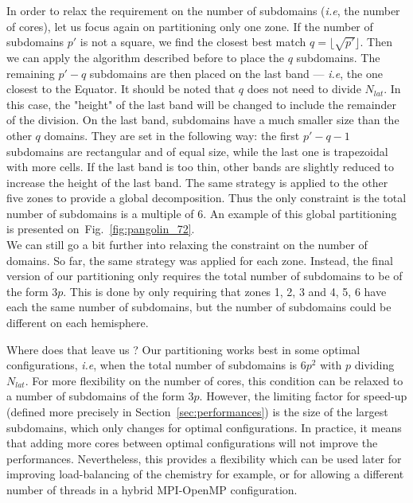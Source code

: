 In order to relax the requirement on the number of subdomains (\textit{i.e}, the
number of cores), let us focus again on partitioning only one zone. If the
number of subdomains $p'$ is not a square, we find the closest best match
$q=\lfloor \sqrt{p'}\rfloor$. Then we can apply the algorithm described before
to place the $q$ subdomains. The remaining $p'-q$ subdomains are then placed on the
last band --- \textit{i.e}, the one closest to the Equator. It should be noted
that $q$ does not need to divide $N_{lat}$. In this case, the "height" of
the last band will be changed to include the remainder of the division.  On the
last band, subdomains have a much smaller size than the other $q$
domains. They are set in the following way: the first $p'-q-1$ subdomains
are rectangular and of equal size, while the last one is trapezoidal with more
cells. If the last band is too thin, other bands are slightly reduced to
increase the height of the last band. The same strategy is applied to the other
five zones to provide a global decomposition. Thus the only constraint is the
total number of subdomains is a multiple of $6$. An example of this global
partitioning is presented on~Fig.~\ref{fig:pangolin_72}.\\
We can still go a bit further into relaxing the constraint on the number of
domains. So far, the same strategy was applied for each zone. Instead, the final
version of our partitioning only requires the total number of subdomains to be of
the form $3p$. This is done by only requiring that zones 1, 2, 3 and 4, 5, 6 have
each the same number of subdomains, but the number of subdomains could be different on
each hemisphere.

Where does that leave us ? Our partitioning works best in some optimal
configurations, \textit{i.e}, when the total number of subdomains is $6p^2$ with
$p$ dividing $N_{lat}$. For more flexibility on the number of cores, this
condition can be relaxed to a number of subdomains of the form $3p$. However, the
limiting factor for speed-up (defined more precisely in
Section~\ref{sec:performances}) is the size of the largest subdomains, which only
changes for optimal configurations. In practice, it means that adding more cores
between optimal configurations will not improve the performances. Nevertheless,
this provides a flexibility which can be used later for improving load-balancing
of the chemistry for example, or for allowing a different number of threads in a
hybrid MPI-OpenMP configuration.

